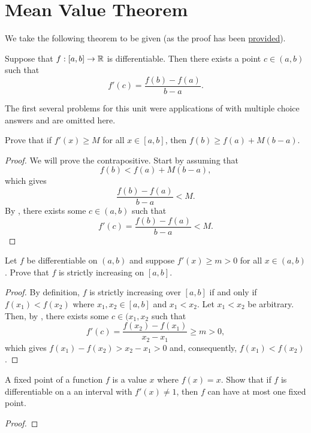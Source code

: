 \section{Mean Value Theorem}

\begin{callout}
  We take the following theorem to be given (as the proof has been
  \href{https://www.youtube.com/watch?v=qtKZo1qOVlQ}{provided}).
  \begin{theorem}
  \label{thm:mean-value-theorem}
    Suppose that $f : [a, b] \to \mathbb{R}$ is differentiable. Then there exists a point $c \in (a, b)$ such that
    \[
      f'(c) = \frac{f(b) - f(a)}{b - a}.
    \]
  \end{theorem}
\end{callout}

\begin{callout}
  The first several problems for this unit were applications of  with multiple choice
  answers and are omitted here.
\end{callout}

\begin{problem}
  Prove that if $f'(x) \geq M$ for all $x \in [a, b]$, then $f(b) \geq f(a) + M(b - a)$.

  \begin{proof}
    We will prove the contrapositive. Start by assuming that
    \[
      f(b) < f(a) + M(b - a),
    \]
    which gives
    \[
      \frac{f(b) - f(a)}{b - a} < M.
    \]
    By , there exists some $c \in (a, b)$ such that
    \[
      f'(c) = \frac{f(b) - f(a)}{b - a} < M.
    \]
  \end{proof}
\end{problem}

\begin{problem}
  Let $f$ be differentiable on $(a, b)$ and suppose $f'(x) \geq m > 0$ for all $x \in (a, b)$.
  Prove that $f$ is strictly increasing on $[a, b]$.

  \begin{proof}

    By definition, $f$ is strictly increasing over $[a, b]$ if and only if $f(x_{1}) < f(x_{2})$ where $x_{1}, x_{2} \in [a, b]$ and $x_{1} < x_{2}$.
    Let $x_{1} < x_{2}$ be arbitrary. Then, by , there exists some $c \in (x_{1}, x_{2}$ such that
    \[
      f'(c) = \frac{f(x_{2}) - f(x_{1})}{x_{2} - x_{1}} \geq m > 0,
    \]
    which gives $f(x_{1}) - f(x_{2}) > x_{2} - x_{1} > 0$ and, consequently, $f(x_{1}) < f(x_{2})$. 
  \end{proof}
\end{problem}

\begin{problem}
  A fixed point of a function $f$ is a value $x$ where $f(x) = x$. Show that if
  $f$ is differentiable on a an interval with $f'(x) \neq 1$, then $f$ can have
  at most one fixed point.

  \begin{proof}
  \end{proof}
  
\end{problem}

